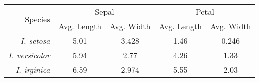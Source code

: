 \begin{tabular}{ r c c c c }
\multirow{2}{*}{Species} &\multicolumn{2}{c}{Sepal}&\multicolumn{2}{c}{Petal}\\
& Avg. Length & Avg. Width & Avg. Length & Avg. Width\\\hline
\textit{I. setosa}&5.01&3.428&1.46&0.246\\
\textit{I. versicolor}&5.94&2.77&4.26&1.33\\
\textit{I. irginica}&6.59&2.974&5.55&2.03\\\hline
\end{tabular}
